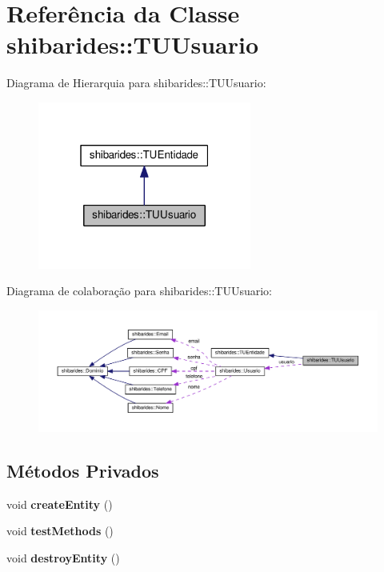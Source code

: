\hypertarget{classshibarides_1_1TUUsuario}{}\section{Referência da Classe shibarides\+:\+:T\+U\+Usuario}
\label{classshibarides_1_1TUUsuario}


Diagrama de Hierarquia para shibarides\+:\+:T\+U\+Usuario\+:\nopagebreak
\begin{figure}[H]
\begin{center}
\leavevmode
\includegraphics[width=199pt]{classshibarides_1_1TUUsuario__inherit__graph}
\end{center}
\end{figure}


Diagrama de colaboração para shibarides\+:\+:T\+U\+Usuario\+:\nopagebreak
\begin{figure}[H]
\begin{center}
\leavevmode
\includegraphics[width=350pt]{classshibarides_1_1TUUsuario__coll__graph}
\end{center}
\end{figure}
\subsection*{Métodos Privados}
\begin{DoxyCompactItemize}
\item 
void {\bfseries create\+Entity} ()\hypertarget{classshibarides_1_1TUUsuario_a3163f75cfa01287d5a67d6096b54d19e}{}\label{classshibarides_1_1TUUsuario_a3163f75cfa01287d5a67d6096b54d19e}

\item 
void {\bfseries test\+Methods} ()\hypertarget{classshibarides_1_1TUUsuario_a621c78831d38b25b8c20635926dd76ba}{}\label{classshibarides_1_1TUUsuario_a621c78831d38b25b8c20635926dd76ba}

\item 
void {\bfseries destroy\+Entity} ()\hypertarget{classshibarides_1_1TUUsuario_a7b61c9c8c874171c0947c4a1f046fe31}{}\label{classshibarides_1_1TUUsuario_a7b61c9c8c874171c0947c4a1f046fe31}

\end{DoxyCompactItemize}
